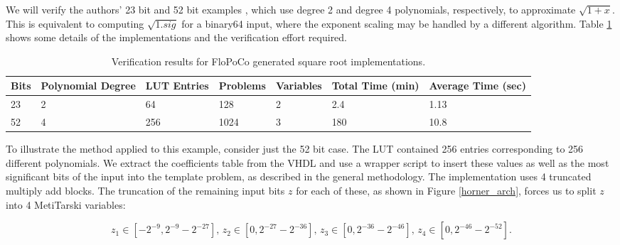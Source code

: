 \documentclass{fac}
\begin{document}
We will verify the authors' 23 bit and 52 bit examples  \cite{DinJolPas2010-poly}, which use degree 2 and degree 4 polynomials, respectively, to approximate $\sqrt{1+x}$. This is equivalent to computing $\sqrt{1.sig}$ for a binary64 input, where the exponent scaling may be handled by a different algorithm. Table \ref{flopo_results} shows some details of the implementations and the verification effort required. 
\begin{center}
\begin{table}
\begin{tabular}{lllllll}
\toprule
Bits & Polynomial Degree & LUT Entries & Problems & Variables & Total Time (min) & Average Time (sec)\\
\midrule
23 & 2 & 64 & 128 & 2 & 2.4 & 1.13 \\
52 & 4 & 256 & 1024 & 3 & 180 & 10.8\\
\bottomrule
\end{tabular}	
\caption{Verification results for FloPoCo generated square root implementations.}\label{flopo_results}     
\end{table}
\end{center}
To illustrate the method applied to this example, consider just the 52 bit case. The LUT contained 256 entries corresponding to 256 different polynomials. We extract the coefficients table from the VHDL and use a wrapper script to insert these values as well as the most significant bits of the input into the template problem, as described in the general methodology. The implementation uses 4 truncated multiply add blocks. The truncation of the remaining input bits $z$ for each of these, as shown in Figure \ref{horner_arch}, forces us to split $z$ into 4 MetiTarski variables:
\begin{center}
\end{center}

\begin{equation*}
    z_1 \in [-2^{-9}, 2^{-9}-2^{-27}], \,
    z_2 \in [0, 2^{-27} - 2^{-36}],\,
    z_3 \in [0, 2^{-36} - 2^{-46}],\,
    z_4 \in [0, 2^{-46} - 2^{-52}].
\end{equation*}
\end{document}
